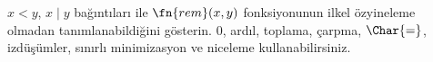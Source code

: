 \begin{prob}
  $x<y$, $x\mid y$ bağıntıları ile $\fn{rem}(x,y)$ fonksiyonunun ilkel
  özyineleme olmadan tanımlanabildiğini gösterin. $0$, ardıl, toplama,
  çarpma, $\Char{=}$, izdüşümler, sınırlı minimizasyon ve niceleme
  kullanabilirsiniz.
\end{prob}

